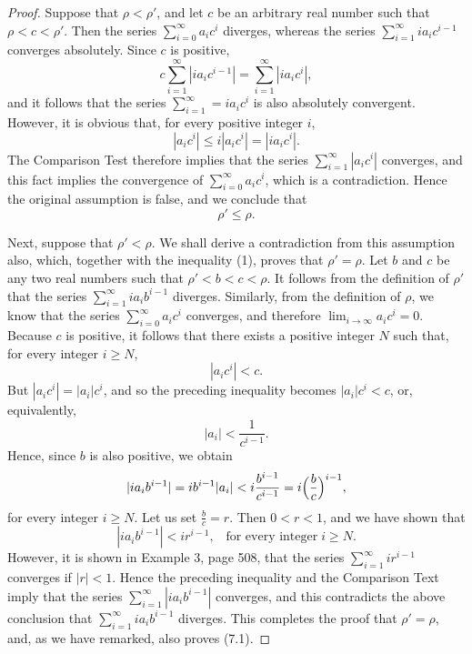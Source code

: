 \begin{proof}
Suppose that $\rho < \rho'$, and let $c$ be an arbitrary real number such that $\rho < c < \rho'$. Then the series $\sum_{i=0}^\infty a_{i}c^i$ diverges, whereas the series $\sum_{i=1}^\infty i a_{i}c^{i-1}$ converges absolutely. Since $c$ is positive,
$$
c \sum_{i=1}^\infty |ia_{i}c^{i-1}| = \sum_{i=1}^\infty |ia_{i}c^i|,  
$$
and it follows that the series $\sum_{i=1}^\infty = ia_{i}c^i$ is also absolutely convergent. However, it is obvious that, for every positive integer $i$, 
$$
|a_{i}c^i| \leq i |a_{i}c^i| = |ia_{i}c^i|.
$$
The Comparison Test therefore implies that the series $\sum_{i=1}^\infty |a_{i}c^i|$ converges, and this fact implies the convergence of $\sum_{i=0}^\infty a_{i}c^i$, which is a contradiction. Hence the original assumption is false, and we conclude that
\begin{equation}
\rho' \leq \rho. 
\label{eq9.7.1}
\end{equation}

Next, suppose that $\rho' < \rho$. We shall derive a contradiction from this assumption also, which, together with the inequality (1), proves that $\rho' = \rho$. Let $b$ and $c$ be any two real numbers such that $\rho' < b < c < \rho$. It follows
from the definition of $\rho'$ that the series $\sum_{i=1}^\infty ia_{i}b^{i-1}$ diverges. Similarly, from the definition of $\rho$, we know that the series $\sum_{i=0}^\infty a_{i}c^i$ converges, and therefore $\lim_{i \rightarrow \infty} a_ic^i = 0$. Because $c$ is positive, it follows that there exists a positive integer $N$ such that, for every integer $i \geq N$,
$$
|a_{i}c^i| < c.
$$
But $|a_ic^i| = |a_i|c^i$, and so the preceding inequality becomes $|a_i|c^i < c$, or, equivalently,
$$
|a_i| < \frac{1}{c^{i-1}}.
$$
Hence, since $b$ is also positive, we obtain
$$
|ia_{i}b^{i-1}| = ib^{i-1} |a_i| < i \frac{b^{i-1}}{c^{i-1}} = i\Bigl(\frac{b}{c}\Bigr)^{i-1} ,
$$
for every integer $i \geq N$. Let us set $\frac{b}{c} = r$. Then $0 < r < 1$, and we have shown that   
$$
|ia_{i}b^{i-1}| < ir^{i-1}, \;\;\;\mbox{for every integer}\; i \geq N .
$$
However, it is shown in Example 3, page 508, that the series $\sum_{i=1}^\infty ir^{i-1}$ converges if $|r| < 1$. Hence the preceding inequality and the Comparison Text imply that the series $\sum_{i=1}^\infty |ia_{i}b^{i-1}|$ converges, and this contradicts the above conclusion that $\sum_{i=1}^\infty ia_{i}b^{i-1}$ diverges. This completes the proof that $\rho' = \rho$, and, as we have remarked, also proves (7.1).
\end{proof}

